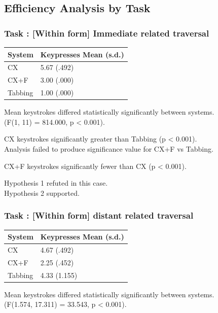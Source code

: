 \documentclass[11pt,openright,a4paper]{report}
\begin{document}
\subsection{Efficiency Analysis by Task}
\newcommand{\navtask}[1]{ \subsubsection{Task : #1}}
\navtask{[Within form] Immediate related traversal}
\begin{tabular}{l l}
\hline\hline %
System & Keypresses Mean (s.d.) \\ [0.5ex] %
\hline %
CX & 5.67 (.492)\\
CX+F & 3.00 (.000)\\
Tabbing & 1.00 (.000)\\ [1ex] %
\hline %
\end{tabular}

Mean keystrokes differed statistically significantly between systems.\\
(F(1, 11) = 814.000, p < 0.001).

CX keystrokes significantly greater than Tabbing (p < 0.001).\\
Analysis failed to produce significance value for CX+F vs Tabbing.

CX+F keystrokes significantly fewer than CX (p < 0.001).

Hypothesis 1 refuted in this case.\\
Hypothesis 2 supported.

\navtask{[Within form] distant related traversal}
\begin{tabular}{l l}
\hline\hline %
System & Keypresses Mean (s.d.) \\ [0.5ex] %
\hline %
CX & 4.67 (.492)\\
CX+F & 2.25 (.452)\\
Tabbing & 4.33 (1.155)\\ [1ex] %
\hline %
\end{tabular}

Mean keystrokes differed statistically significantly between systems.\\
(F(1.574, 17.311) = 33.543, p < 0.001).
\end{document}
